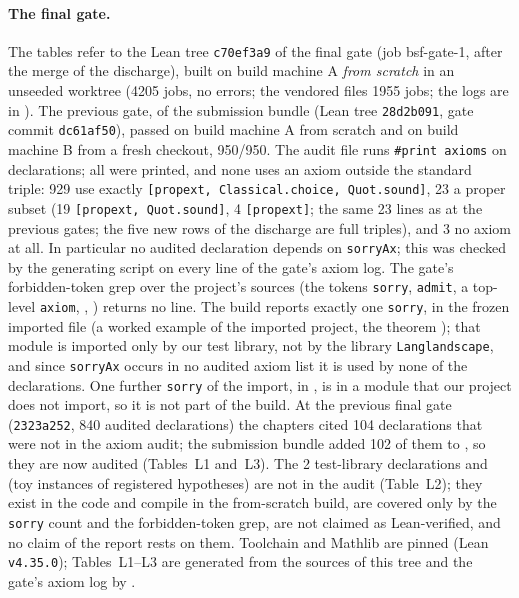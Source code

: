 \begin{sloppypar}
\paragraph{The final gate.}
The tables refer to the Lean tree \texttt{c70ef3a9} of the final gate (job bsf-gate-1, after the merge of the
 discharge), built on build machine A \emph{from scratch} in an unseeded worktree (4205 jobs, no errors;
the vendored files 1955 jobs; the logs are in ). The previous gate, of the submission bundle (Lean tree \texttt{28d2b091}, gate commit
\texttt{dc61af50}), passed on build machine A from scratch and on build machine B from a fresh checkout, 950/950.
The audit file  runs \texttt{\#print axioms} on \NumAuditedRows{}
declarations; all \GateAudited{} were printed, and none uses an axiom outside the standard triple: 929 use exactly
\texttt{[propext, Classical.choice, Quot.sound]}, 23 a proper subset (19 \texttt{[propext, Quot.sound]}, 4
\texttt{[propext]}; the same 23 lines as at the previous gates; the five new rows of the  discharge are full triples), and 3 no axiom at all. In particular no audited declaration depends on \texttt{sorryAx}; this was
checked by the generating script on every line of the gate's axiom log. The gate's forbidden-token grep over the project's sources
(the tokens \texttt{sorry}, \texttt{admit}, a top-level \texttt{axiom}, ,
) returns no line. The build reports
exactly one \texttt{sorry}, in the frozen imported file  (a worked example of
the imported project, the theorem ); that module is imported only by our test
library, not by the library \texttt{Langlandscape}, and since \texttt{sorryAx} occurs in no audited axiom list it is
used by none of the \NumAuditedRows{} declarations. One further \texttt{sorry} of the import,
 in , is in a module that our project does not
import, so it is not part of the build. At the previous final gate (\texttt{2323a252}, 840 audited declarations) the chapters
cited 104 declarations that were not in the axiom audit; the submission bundle added 102 of them to
, so they are now audited (Tables~L1 and~L3). The 2 test-library declarations
 and  (toy instances of
registered hypotheses) are not in the audit (Table~L2); they exist in the code and compile in the from-scratch build, are covered only
by the \texttt{sorry} count and the forbidden-token grep, are not claimed as Lean-verified, and no claim of the report rests on them. Toolchain and Mathlib are pinned (Lean \texttt{v4.35.0}); Tables~L1--L3 are generated from
the sources of this tree and the gate's axiom log by .
\end{sloppypar}


